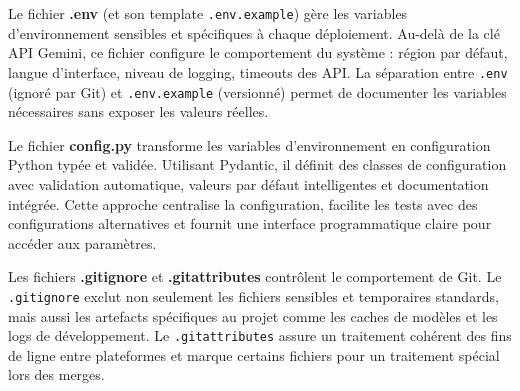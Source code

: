 
Le fichier \textbf{.env} (et son template \texttt{.env.example}) gère les variables d'environnement sensibles et spécifiques à chaque déploiement. Au-delà de la clé API Gemini, ce fichier configure le comportement du système : région par défaut, langue d'interface, niveau de logging, timeouts des API. La séparation entre \texttt{.env} (ignoré par Git) et \texttt{.env.example} (versionné) permet de documenter les variables nécessaires sans exposer les valeurs réelles.

Le fichier \textbf{config.py} transforme les variables d'environnement en configuration Python typée et validée. Utilisant Pydantic, il définit des classes de configuration avec validation automatique, valeurs par défaut intelligentes et documentation intégrée. Cette approche centralise la configuration, facilite les tests avec des configurations alternatives et fournit une interface programmatique claire pour accéder aux paramètres.

Les fichiers \textbf{.gitignore} et \textbf{.gitattributes} contrôlent le comportement de Git. Le \texttt{.gitignore} exclut non seulement les fichiers sensibles et temporaires standards, mais aussi les artefacts spécifiques au projet comme les caches de modèles et les logs de développement. Le \texttt{.gitattributes} assure un traitement cohérent des fins de ligne entre plateformes et marque certains fichiers pour un traitement spécial lors des merges.

